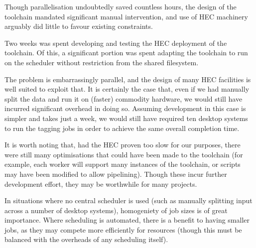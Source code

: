 
Though parallelisation undoubtedly saved countless hours, the design of the toolchain mandated significant manual intervention, and use of HEC machinery arguably did little to favour existing constraints.

Two weeks was spent developing and testing the HEC deployment of the toolchain.  Of this, a significant portion was spent adapting the toolchain to run on the scheduler without restriction from the shared filesystem.

The problem is embarrassingly parallel, and the design of many HEC facilities is well suited to exploit that.  It is certainly the case that, even if we had manually split the data and run it on (faster) commodity hardware, we would still have incurred significant overhead in doing so.  Assuming development in this case is simpler and takes just a week, we would still have required ten desktop systems to run the tagging jobs in order to achieve the same overall completion time.  

It is worth noting that, had the HEC proven too slow for our purposes, there were still many optimisations that could have been made to the toolchain (for example, each worker will support many instances of the toolchain, or scripts may have been modified to allow pipelining).  Though these incur further development effort, they may be worthwhile for many projects.

In situations where no central scheduler is used (such as manually splitting input across a number of desktop systems), homogeniety of job sizes is of great importance.  Where scheduling is automated, there is a benefit to having smaller jobs, as they may compete more efficiently for resources (though this must be balanced with the overheads of any scheduling itself).

